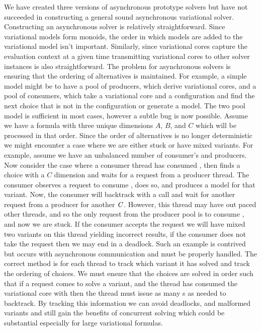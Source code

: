 We have created three versions of asynchronous prototype solvers but have not
succeeded in constructing a general sound asynchronous variational solver.
Constructing an asynchronous solver is relatively straightforward. Since
variational models form monoids, the order in which models are added to the
variational model isn't important. Similarly, since variational cores capture
the evaluation context at a given time transmitting variational cores to other
solver instances is also straightforward. The problem for asynchronous solvers
is ensuring that the ordering of alternatives is maintained. For example, a
simple model might be to have a pool of producers, which derive variational
cores, and a pool of consumers, which take a variational core and a
configuration and find the next choice that is not in the configuration or
generate a model. The two pool model is sufficient in most cases, however a
subtle bug is now possible. Assume we have a formula with three unique
dimensions $A$, $B$, and $C$ which will be processed in that order. Since the
order of alternatives is no longer deterministic we might encounter a case where
we are either stuck or have mixed variants. For example, assume we have an
unbalanced number of consumer's and producers. Now consider the case where a
consumer thread has consumed , then finds a choice
with a $C$ dimension and waits for a request from a producer thread. The
consumer observes a request to consume , does so, and produces a
model for that variant. Now, the consumer will backtrack with a  call
and wait for another request from a producer for another $\mathit{C}$. However, this
thread may have out paced other threads, and so the only request from the
producer pool is to consume , and now we are stuck. If the
consumer accepts the request we will have mixed two variants on this thread
yielding incorrect results, if the consumer does not take the request then we
may end in a deadlock. Such an example is contrived but occurs with asynchronous
communication and must be properly handled. The correct method is for each
thread to track which variant it has solved and track the ordering of choices.
We must ensure that the choices are solved in order such that if a request comes
to solve a  variant, and the thread has consumed the
variational core with  then the thread must issue as many
s as needed to backtrack. By tracking this information we can avoid
deadlocks, and malformed variants and still gain the benefits of concurrent
solving which could be substantial especially for large variational formulas.


